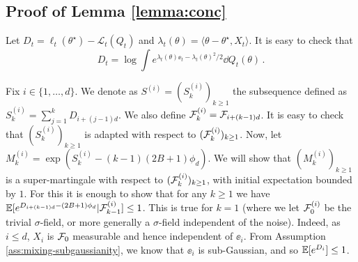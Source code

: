 \subsection[Proof of Lemma 1]{Proof of Lemma \ref{lemma:conc}}
Let $D_t = \ell_t(\theta^\star) - \mathcal L_t(Q_t)$ and $\lambda_t(\theta) = \langle \theta -\theta^\star, X_t\rangle$. It is easy to check that
$$D_t = \log\int e^{\lambda_t(\theta)\ee_t - \lambda_t(\theta)^2/2}\dd Q_t(\theta)\,.$$


Fix $i\in \{1,\dots, d\}$. We denote as $S^{(i)} = (S_k^{(i)})_{k\geq 1}$ the subsequence defined as $S_k^{(i)} = \sum_{j=1}^k D_{i+(j-1)d}$. We also define $\mathcal{F}^{(i)}_k = \mathcal{F}_{i+(k-1)d}$. It is easy to check that $(S_k^{(i)})_{k\geq 1}$ is adapted with respect to $(\mathcal{F}^{(i)}_k)_{k\geq 1}$. Now, let $M^{(i)}_k = \exp (S_k^{(i)} - (k-1)(2B+1)\phi_d)$. We will show that $(M^{(i)}_k)_{k\geq1}$ is a super-martingale with respect to $(\mathcal{F}^{(i)}_k)_{k\geq 1}$, with initial expectation bounded by $1$. For this it is enough to show that for any $k\geq 1$ we have $\mathbb{E}[e^{D_{i+(k-1)d}-(2B+1)\phi_d}|\mathcal{F}^{(i)}_{k-1}] \leq 1$. This is true for $k=1$ (where we let $\mathcal{F}^{(i)}_0$ be the trivial $\sigma$-field, or more generally a $\sigma$-field independent of the noise). Indeed, as $i\leq d$, $X_i$ is $\mathcal{F}_0$ measurable and hence independent of $\ee_i$. From Assumption \ref{ass:mixing-subgaussianity}, we know that $\ee_i$ is sub-Gaussian, and so $\mathbb{E}[e^{D_i}]\leq 1$. 

